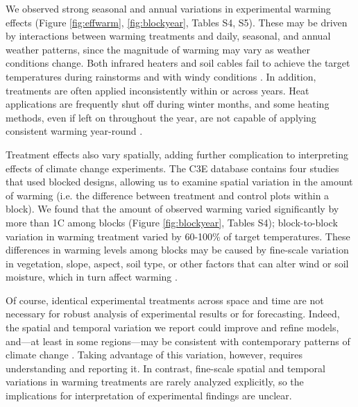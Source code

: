 \documentclass{article}
\begin{document}
\par We observed strong seasonal and annual variations in experimental warming effects (Figure \ref{fig:effwarm}, \ref{fig:blockyear}, Tables S4, S5). These may be driven by interactions between warming treatments and daily, seasonal, and annual weather patterns, since the magnitude of warming may vary as weather conditions change.  Both infrared heaters and soil cables fail to achieve the target temperatures during rainstorms \citep{peterjohn1993,hoeppner2012} and with windy conditions \citep{kimball2005,kimball2008}. In addition, treatments are often applied inconsistently within or across years. Heat applications are frequently shut off during winter months, and some heating methods, even if left on throughout the year, are not capable of applying consistent warming year-round \citep[e.g.][]{clark2014a,clark2014b,hagedorn2010}. 

\par Treatment effects also vary spatially, adding further complication to interpreting effects of climate change experiments. The C3E database contains four studies that used blocked designs, allowing us to examine spatial variation in the amount of warming (i.e. the difference between treatment and control plots within a block). We found that the amount of observed warming varied significantly by more than 1\degree C among blocks (Figure \ref{fig:blockyear}, Tables S4); block-to-block variation in warming treatment varied by 60-100\% of target temperatures. These differences in warming levels among blocks may be caused by fine-scale variation in vegetation, slope, aspect, soil type, or other factors that can alter wind or soil moisture, which in turn affect warming \citep{peterjohn1993,kimball2005,kimball2008,hoeppner2012,rollinson2015}. 

\par Of course, identical experimental treatments across space and time are not necessary for robust analysis of experimental results or for forecasting. Indeed, the spatial and temporal variation we report could improve and refine models, and---at least in some regions---may be consistent with contemporary patterns of climate change \citep{ipcc2013}. Taking advantage of this variation, however, requires understanding and reporting it. In contrast, fine-scale spatial and temporal variations in warming treatments are rarely analyzed explicitly, so the implications for interpretation of experimental findings are unclear. %
\end{document}
